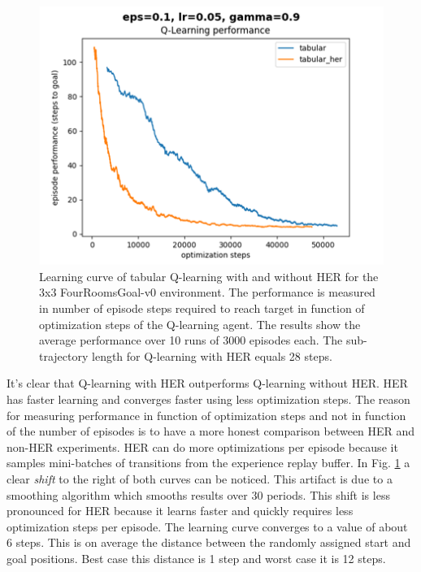 \documentclass[conference]{IEEEtran}
\begin{document}
\begin{figure}[ht]
\centering
\includegraphics[width=0.9\columnwidth]{img/exp_tabular_her_fourroom_small.png}
\caption{Learning curve of tabular Q-learning with and without HER for the 3x3 FourRoomsGoal-v0 environment. The performance is measured in number of episode steps required to reach target in function of optimization steps of the Q-learning agent. The results show the average performance over 10 runs of 3000 episodes each. The sub-trajectory length for Q-learning with HER equals 28 steps.}
\label{fig:experiment_fourroomsgoal_learning_performance}
\end{figure}

It's clear that Q-learning with HER outperforms Q-learning without HER. HER has faster learning and converges faster using less optimization steps. The reason for measuring performance in function of optimization steps and not in function of the number of episodes is to have a more honest comparison between HER and non-HER experiments. HER can do more optimizations per episode because it samples mini-batches of transitions from the experience replay buffer. In Fig. \ref{fig:experiment_fourroomsgoal_learning_performance} a clear \textit{shift} to the right of both curves can be noticed. This artifact is due to a smoothing algorithm which smooths results over 30 periods. This shift is less pronounced for HER because it learns faster and quickly requires less optimization steps per episode. The learning curve converges to a value of about 6 steps. This is on average the distance between the randomly assigned start and goal positions. Best case this distance is 1 step and worst case it is 12 steps.
\end{document}
